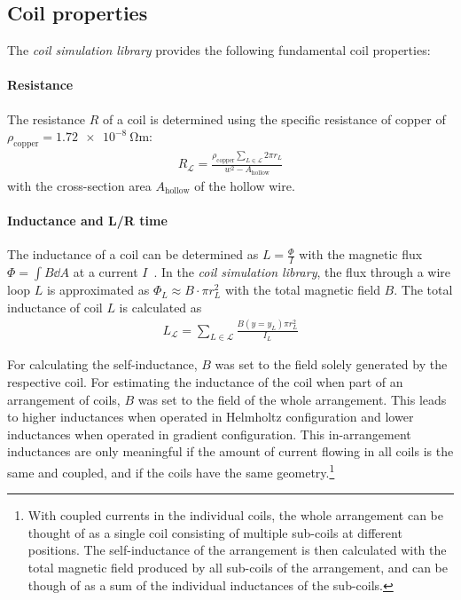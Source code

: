 \subsection*{Coil properties}
The \textit{coil simulation library} provides the following fundamental coil properties:
\paragraph{Resistance}
The resistance $R$ of a coil is determined using the specific resistance of copper of $\rho_\text{copper} = \SI{1.72e-8}{\ohm\meter}$:
\begin{align}\label{eq:resistance_simulation}
    R_\mathcal{L} = \frac{\rho_\text{copper} \sum\limits_{L \in \mathcal{L}} 2\pi r_L} {w^2 - A_\text{hollow}}
\end{align}
with the cross-section area $A_\text{hollow}$ of the hollow wire.

\paragraph{Inductance and L/R time} The inductance of a coil can be determined as $L = \frac{\Phi}{I}$ with the magnetic flux $\Phi = \int B \dd A$ at a current $I$~\cite{demtroder_zeitlich_2013}. In the \textit{coil simulation library}, the flux through a wire loop $L$ is approximated as $\Phi_L \approx B \cdot \pi r_L^2$ with the total magnetic field $B$. The total inductance of coil $L$ is calculated as
\begin{align}\label{eq:inductance_simulation}
    L_\mathcal{L} = \sum\limits_{L \in \mathcal{L}} \frac{B(y = y_L) \pi r_L^2}{I_L}
\end{align}

For calculating the self-inductance, $B$ was set to the field solely generated by the respective coil. For estimating the inductance of the coil when part of an arrangement of coils, $B$ was set to the field of the whole arrangement. This leads to higher inductances when operated in Helmholtz configuration and lower inductances when operated in gradient configuration. This in-arrangement inductances are only meaningful if the amount of current flowing in all coils is the same and coupled, and if the coils have the same geometry.\footnote{With coupled currents in the individual coils, the whole arrangement can be thought of as a single coil consisting of multiple sub-coils at different positions. The self-inductance of the arrangement is then calculated with the total magnetic field produced by all sub-coils of the arrangement, and can be though of as a sum of the individual inductances of the sub-coils.}

